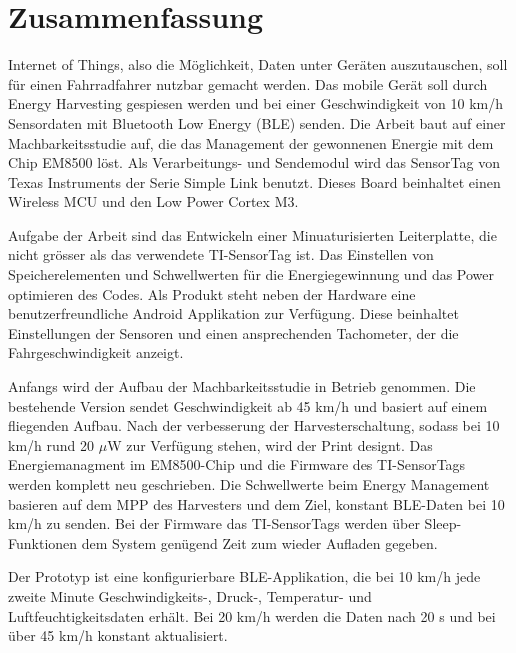 \chapter{Zusammenfassung}

Internet of Things, also die Möglichkeit, Daten unter Geräten auszutauschen, soll für einen Fahrradfahrer nutzbar gemacht werden. Das  mobile Gerät soll durch Energy Harvesting gespiesen werden und bei einer Geschwindigkeit von 10 km/h Sensordaten mit Bluetooth Low Energy (BLE) senden. Die Arbeit baut auf einer Machbarkeitsstudie auf, die das Management der gewonnenen Energie mit dem Chip EM8500 löst. Als Verarbeitungs- und Sendemodul wird das SensorTag von Texas Instruments der Serie Simple Link benutzt. Dieses Board beinhaltet einen Wireless MCU und den Low Power Cortex M3. 

Aufgabe der Arbeit sind das Entwickeln einer Minuaturisierten Leiterplatte, die nicht grösser als das verwendete TI-SensorTag ist. Das Einstellen von Speicherelementen und Schwellwerten für die Energiegewinnung und das Power optimieren des Codes. Als Produkt steht neben der Hardware eine benutzerfreundliche Android Applikation zur Verfügung. 
Diese beinhaltet Einstellungen der Sensoren und einen ansprechenden Tachometer, der die Fahrgeschwindigkeit anzeigt. 

Anfangs wird der Aufbau der Machbarkeitsstudie in Betrieb genommen. Die bestehende Version sendet Geschwindigkeit ab 45 km/h und basiert auf einem fliegenden Aufbau.
Nach der verbesserung der Harvesterschaltung, sodass bei 10 km/h rund 20 $\mu$W zur Verfügung stehen, wird der Print designt. Das Energiemanagment im EM8500-Chip und die Firmware des TI-SensorTags werden komplett neu geschrieben. Die Schwellwerte beim Energy Management basieren auf dem MPP des Harvesters und dem Ziel, konstant BLE-Daten bei 10 km/h zu senden. Bei der Firmware das TI-SensorTags werden über Sleep-Funktionen dem System genügend Zeit zum wieder Aufladen gegeben. 

Der Prototyp ist eine konfigurierbare BLE-Applikation, die bei 10 km/h jede zweite Minute Geschwindigkeits-, Druck-, Temperatur- und Luftfeuchtigkeitsdaten erhält. Bei 20 km/h werden die Daten nach 20 s und bei über 45 km/h konstant aktualisiert.